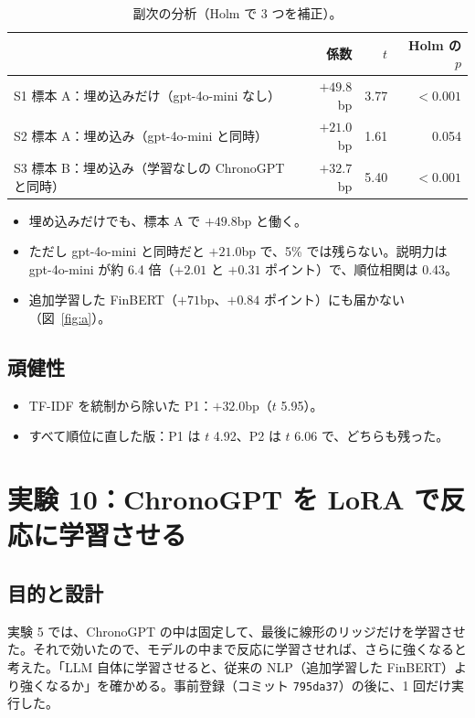 \documentclass[xelatex,ja=standard,jafont=haranoaji,a4paper,10pt,openany]{bxjsreport}
\newcommand{\code}[1]{\texttt{#1}}
\newcommand{\figref}[1]{図~\ref{#1}}
\begin{document}
\begin{table}[H]
\centering
\caption{副次の分析（Holm で 3 つを補正）。}
\small
\begin{tabular}{lrrr}
\toprule
& 係数 & $t$ & Holm の $p$ \\
\midrule
S1 標本 A：埋め込みだけ（gpt-4o-mini なし） & $+49.8$bp & 3.77 & $<0.001$ \\
S2 標本 A：埋め込み（gpt-4o-mini と同時） & $+21.0$bp & 1.61 & 0.054 \\
S3 標本 B：埋め込み（学習なしの ChronoGPT と同時） & $+32.7$bp & 5.40 & $<0.001$ \\
\bottomrule
\end{tabular}
\end{table}

\begin{itemize}
\item 埋め込みだけでも、標本 A で $+49.8$bp と働く。
\item ただし gpt-4o-mini と同時だと $+21.0$bp で、5\% では残らない。説明力は gpt-4o-mini が約 6.4 倍（$+2.01$ と $+0.31$ ポイント）で、順位相関は 0.43。
\item 追加学習した FinBERT（$+71$bp、$+0.84$ ポイント）にも届かない（\figref{fig:a}）。
\end{itemize}

\section{頑健性}

\begin{itemize}
\item TF-IDF を統制から除いた P1：$+32.0$bp（$t$ 5.95）。
\item すべて順位に直した版：P1 は $t$ 4.92、P2 は $t$ 6.06 で、どちらも残った。
\end{itemize}

\chapter{実験 10：ChronoGPT を LoRA で反応に学習させる}\label{ch:e10}

\section{目的と設計}

実験 5 では、ChronoGPT の中は固定して、最後に線形のリッジだけを学習させた。それで効いたので、モデルの中まで反応に学習させれば、さらに強くなると考えた。「LLM 自体に学習させると、従来の NLP（追加学習した FinBERT）より強くなるか」を確かめる。事前登録（コミット \code{795da37}）の後に、1 回だけ実行した。
\end{document}
